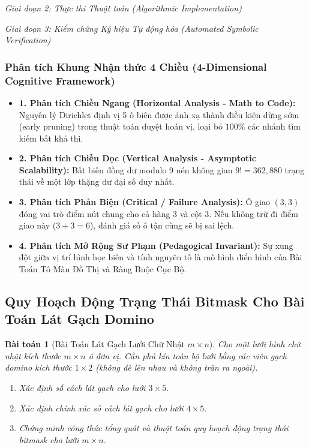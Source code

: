 \documentclass{article}
\newtheorem{baitoan}{Bài toán}
\begin{document}
\vspace{0.5em}\noindent\emph{Giai đoạn 2: Thực thi Thuật toán (Algorithmic Implementation)}


\vspace{0.5em}\noindent\emph{Giai đoạn 3: Kiểm chứng Ký hiệu Tự động hóa (Automated Symbolic Verification)}


\subsubsection*{Phân tích Khung Nhận thức 4 Chiều (4-Dimensional Cognitive Framework)}
\begin{itemize}
    \item \textbf{1. Phân tích Chiều Ngang (Horizontal Analysis - Math to Code):} Nguyên lý Dirichlet định vị 5 ô biên được ánh xạ thành điều kiện dừng sớm (early pruning) trong thuật toán duyệt hoán vị, loại bỏ $100\%$ các nhánh tìm kiếm bất khả thi.
    \item \textbf{2. Phân tích Chiều Dọc (Vertical Analysis - Asymptotic Scalability):} Bất biến đồng dư modulo 9 nén không gian $9! = 362,880$ trạng thái về một lớp thặng dư đại số duy nhất.
    \item \textbf{3. Phân tích Phản Biện (Critical / Failure Analysis):} Ô giao $(3, 3)$ đóng vai trò điểm nút chung cho cả hàng 3 và cột 3. Nếu không trừ đi điểm giao này ($3 + 3 = 6$), đánh giá số ô tận cùng sẽ bị sai lệch.
    \item \textbf{4. Phân tích Mở Rộng Sư Phạm (Pedagogical Invariant):} Sự xung đột giữa vị trí hình học biên và tính nguyên tố là mô hình điển hình của Bài Toán Tô Màu Đồ Thị và Ràng Buộc Cục Bộ.
\end{itemize}

\subsection{Quy Hoạch Động Trạng Thái Bitmask Cho Bài Toán Lát Gạch Domino}

\begin{baitoan}[Bài Toán Lát Gạch Lưới Chữ Nhật $m \times n$]
Cho một lưới hình chữ nhật kích thước $m \times n$ ô đơn vị. Cần phủ kín toàn bộ lưới bằng các viên gạch domino kích thước $1 \times 2$ (không đè lên nhau và không tràn ra ngoài).
\begin{enumerate}
    \item[(a)] Xác định số cách lát gạch cho lưới $3 \times 5$.
    \item[(b)] Xác định chính xác số cách lát gạch cho lưới $4 \times 5$.
    \item[(c)] Chứng minh công thức tổng quát và thuật toán quy hoạch động trạng thái bitmask cho lưới $m \times n$.
\end{enumerate}
\end{baitoan}
\end{document}
